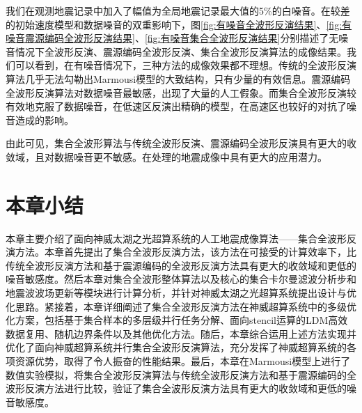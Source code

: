\documentclass[degree=doctor]{thuthesis}
\begin{document}
我们在观测地震记录中加入了幅值为全局地震记录最大值的5\%的白噪音。在较差的初始速度模型和数据噪音的双重影响下，图\ref{fig:有噪音全波形反演结果}、\ref{fig:有噪音震源编码全波形反演结果}、\ref{fig:有噪音集合全波形反演结果}分别描述了无噪音情况下全波形反演、震源编码全波形反演、集合全波形反演算法的成像结果。我们可以看到，在有噪音情况下，三种方法的成像效果都不理想。传统的全波形反演算法几乎无法勾勒出Marmousi模型的大致结构，只有少量的有效信息。震源编码全波形反演算法对数据噪音最敏感，出现了大量的人工假象。而集合全波形反演较有效地克服了数据噪音，在低速区反演出精确的模型，在高速区也较好的对抗了噪音造成的影响。

由此可见，集合全波形算法与传统全波形反演、震源编码全波形反演具有更大的收敛域，且对数据噪音更不敏感。在处理的地震成像中具有更大的应用潜力。


\section{本章小结} %
\label{sec:本章小结}

本章主要介绍了面向神威太湖之光超算系统的人工地震成像算法——集合全波形反演方法。本章首先提出了集合全波形反演方法，该方法在可接受的计算效率下，比传统全波形反演方法和基于震源编码的全波形反演方法具有更大的收敛域和更低的噪音敏感度。然后本章对集合全波形整体算法以及核心的集合卡尔曼滤波分析步和地震波波场更新等模块进行计算分析，并针对神威太湖之光超算系统提出设计与优化思路。紧接着，本章详细阐述了集合全波形反演方法在神威超算系统中的多级优化方案，包括基于集合样本的多层级并行任务分解、面向stencil运算的LDM高效数据复用、随机边界条件以及其他优化方法。随后，本章综合运用上述方法实现并优化了面向神威超算系统并行集合全波形反演算法，充分发挥了神威超算系统的各项资源优势，取得了令人振奋的性能结果。最后，本章在Marmousi模型上进行了数值实验模拟，将集合全波形反演算法与传统全波形反演方法和基于震源编码的全波形反演方法进行比较，验证了集合全波形反演方法具有更大的收敛域和更低的噪音敏感度。



%
%


\backmatter

\listoffigures
\listoftables
\listofequations



% 





%



%
\end{document}
